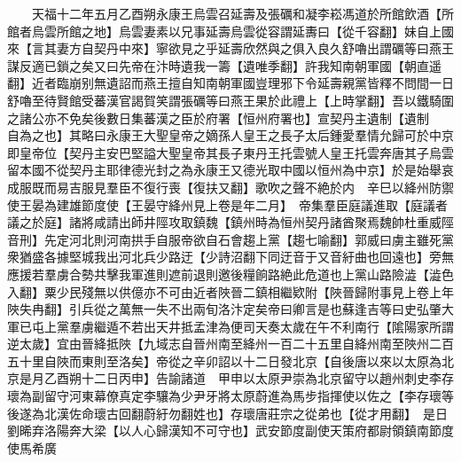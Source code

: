 　　天福十二年五月乙酉朔永康王烏雲召延壽及張礪和凝李崧馮道於所館飲酒【所館者烏雲所館之地】烏雲妻素以兄事延壽烏雲從容謂延夀曰【從千容翻】妹自上國來【言其妻方自契丹中來】寧欲見之乎延壽欣然與之俱入良久舒嚕出謂礪等曰燕王謀反適已鎖之矣又曰先帝在汴時遺我一籌【遺唯季翻】許我知南朝軍國【朝直遥翻】近者臨崩别無遺詔而燕王擅自知南朝軍國豈理邪下令延壽親黨皆釋不問間一日舒嚕至待賢館受蕃漢官謁賀笑謂張礪等曰燕王果於此禮上【上時掌翻】吾以鐵騎圍之諸公亦不免矣後數日集蕃漢之臣於府署【恒州府署也】宣契丹主遺制【遺制　　自為之也】其略曰永康王大聖皇帝之嫡孫人皇王之長子太后鍾愛羣情允歸可於中京即皇帝位【契丹主安巴堅謚大聖皇帝其長子東丹王托雲號人皇王托雲奔唐其子烏雲留本國不從契丹主耶律德光封之為永康王又德光取中國以恒州為中京】於是始舉哀成服既而易吉服見羣臣不復行喪【復扶又翻】歌吹之聲不絶於内　辛巳以絳州防禦使王晏為建雄節度使【王晏守絳州見上卷是年二月】　帝集羣臣庭議進取【庭議者議之於庭】諸將咸請出師井陘攻取鎮魏【鎮州時為恒州契丹諸酋聚焉魏帥杜重威陘音刑】先定河北則河南拱手自服帝欲自石會趨上黨【趨七喻翻】郭威曰虜主雖死黨衆猶盛各據堅城我出河北兵少路迂【少詩沼翻下同迂音于又音紆曲也回遠也】旁無應援若羣虜合勢共擊我軍進則遮前退則邀後糧餉路絶此危道也上黨山路險澁【澁色入翻】粟少民殘無以供億亦不可由近者陜晉二鎮相繼欵附【陜晉歸附事見上卷上年陜失冉翻】引兵從之萬無一失不出兩旬洛汴定矣帝曰卿言是也蘇逢吉等曰史弘肇大軍已屯上黨羣虜繼遁不若出天井抵孟津為便司天奏太歲在午不利南行【隂陽家所謂逆太歲】宜由晉絳抵陜【九域志自晉州南至絳州一百二十五里自絳州南至陜州二百五十里自陜而東則至洛矣】帝從之辛卯詔以十二日發北京【自後唐以來以太原為北京是月乙酉朔十二日丙申】告諭諸道　甲申以太原尹崇為北京留守以趙州刺史李存瓌為副留守河東幕僚真定李驤為少尹牙將太原蔚進為馬步指揮使以佐之【李存瓌等後遂為北漢佐命瓌古回翻蔚紆勿翻姓也】存瓌唐莊宗之從弟也【從才用翻】　是日劉晞弃洛陽奔大梁【以人心歸漢知不可守也】武安節度副使天策府都尉領鎮南節度使馬希廣

